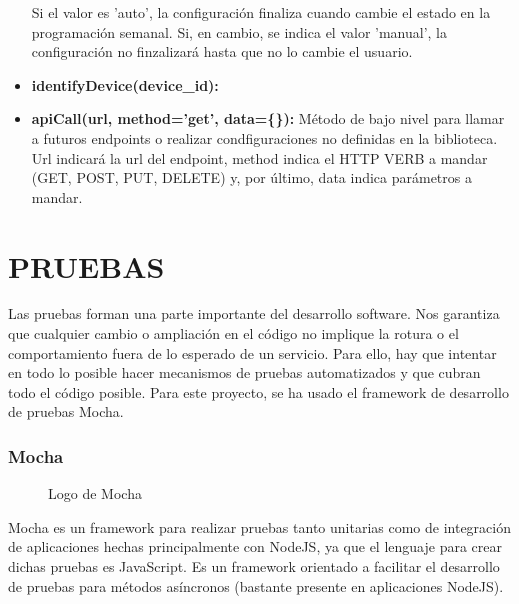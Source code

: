 \documentclass[spanish,12pt, a4paper, twoside]{paper}
\let\oldsection\section
\def\section{\cleardoublepage\oldsection}
\begin{document}
\begin{itemize}
Si el valor es 'auto', la configuración finaliza cuando cambie el estado en la programación semanal. Si, en cambio, se indica el valor 'manual', la configuración no finzalizará hasta que no lo cambie el usuario.
\item\textbf{identifyDevice(device\_id):}
\item\textbf{apiCall(url, method='get', data=\{\}):} Método de bajo nivel para llamar a futuros endpoints o realizar condfiguraciones no definidas en la biblioteca. Url indicará la url del endpoint, method indica el HTTP VERB a mandar (GET, POST, PUT, DELETE) y, por último, data indica parámetros a mandar.
\end{itemize}

\section{PRUEBAS}

Las pruebas forman una parte importante del desarrollo software. Nos garantiza que cualquier cambio o ampliación en el código no implique la rotura o el comportamiento fuera de lo esperado de un servicio. Para ello, hay que intentar en todo lo posible hacer mecanismos de pruebas automatizados y que cubran todo el código posible. Para este proyecto, se ha usado el framework de desarrollo de pruebas Mocha.

\subsubsection{Mocha}

\begin{figure}
\centering
	
\caption{Logo de Mocha}
\label{fig:Logo de Mocha}
\end{figure}

Mocha es un framework para realizar pruebas tanto unitarias como de integración de aplicaciones hechas principalmente con NodeJS, ya que el lenguaje para crear dichas pruebas es JavaScript. Es un framework orientado a facilitar el desarrollo de pruebas para métodos asíncronos (bastante presente en aplicaciones NodeJS).
\newline
\end{document}

